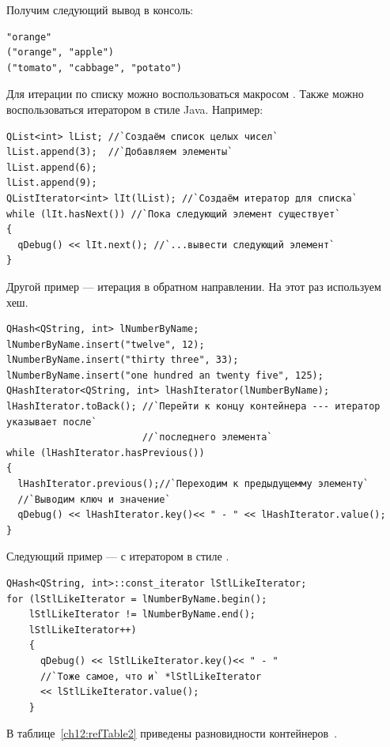 Получим следующий вывод в консоль:
\begin{verbatim}
"orange" 
("orange", "apple") 
("tomato", "cabbage", "potato")
\end{verbatim}

Для итерации по списку можно воспользоваться макросом
. Также можно
воспользоваться итератором в стиле Java. Например:
\begin{lstlisting}
QList<int> lList; //`Создаём список целых чисел`
lList.append(3);  //`Добавляем элементы`
lList.append(6);
lList.append(9);
QListIterator<int> lIt(lList); //`Создаём итератор для списка`
while (lIt.hasNext()) //`Пока следующий элемент существует`
{
  qDebug() << lIt.next(); //`...вывести следующий элемент`
}
\end{lstlisting}

Другой пример --- итерация в обратном направлении. На этот раз используем хеш.
\begin{lstlisting}
QHash<QString, int> lNumberByName;
lNumberByName.insert("twelve", 12);
lNumberByName.insert("thirty three", 33);
lNumberByName.insert("one hundred an twenty five", 125);
QHashIterator<QString, int> lHashIterator(lNumberByName);
lHashIterator.toBack(); //`Перейти к концу контейнера --- итератор указывает после` 
                        //`последнего элемента`
while (lHashIterator.hasPrevious())
{
  lHashIterator.previous();//`Переходим к предыдущемму элементу`
  //`Выводим ключ и значение`
  qDebug() << lHashIterator.key()<< " - " << lHashIterator.value();
}
\end{lstlisting}

Следующий пример  --- с итератором в стиле .
\begin{lstlisting}
QHash<QString, int>::const_iterator lStlLikeIterator;
for (lStlLikeIterator = lNumberByName.begin();
    lStlLikeIterator != lNumberByName.end();
    lStlLikeIterator++)
    {
      qDebug() << lStlLikeIterator.key()<< " - "
      //`Тоже самое, что и` *lStlLikeIterator
      << lStlLikeIterator.value();
    }
\end{lstlisting}

В таблице~\ref{ch12:refTable2} приведены разновидности контейнеров~. 

